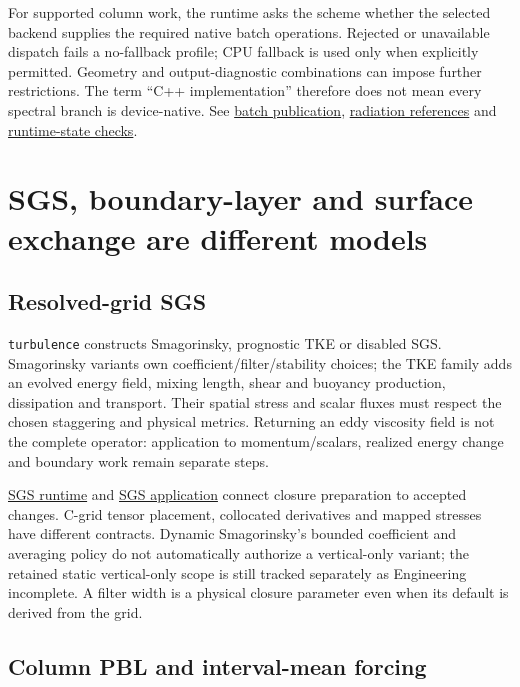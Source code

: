For supported column work, the runtime asks the scheme whether the selected
backend supplies the required native batch operations. Rejected or unavailable
dispatch fails a no-fallback profile; CPU fallback is used only when explicitly
permitted. Geometry and output-diagnostic combinations can impose further
restrictions. The term ``C++ implementation'' therefore does not mean every
spectral branch is device-native. See
\href{../src/radiation/native_batch_runtime.cpp}{batch publication},
\href{../tests/physics/test_radiation.cpp}{radiation references} and
\href{../tests/physics/test_radiation_runtime_state.cpp}{runtime-state checks}.

\section{SGS, boundary-layer and surface exchange are different models}
\label{architecture-mixing-surface}

\subsection{Resolved-grid SGS}

\texttt{turbulence} constructs Smagorinsky, prognostic TKE or disabled SGS.
Smagorinsky variants own coefficient/filter/stability choices; the TKE family
adds an evolved energy field, mixing length, shear and buoyancy production,
dissipation and transport. Their spatial stress and scalar fluxes must respect
the chosen staggering and physical metrics. Returning an eddy viscosity field
is not the complete operator: application to momentum/scalars, realized energy
change and boundary work remain separate steps.

\href{../src/turbulence/runtime.cpp}{SGS runtime} and
\href{../src/core/orchestration/dynamics/sgs_apply.cpp}{SGS application}
connect closure preparation to accepted changes. C-grid tensor placement,
collocated derivatives and mapped stresses have different contracts. Dynamic
Smagorinsky's bounded coefficient and averaging policy do not automatically
authorize a vertical-only variant; the retained static vertical-only scope is
still tracked separately as Engineering incomplete. A filter width is a
physical closure parameter even when its default is derived from the grid.

\subsection{Column PBL and interval-mean forcing}


